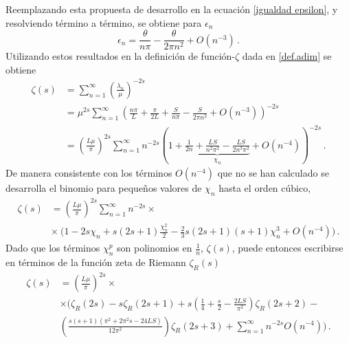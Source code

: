Reemplazando esta propuesta de desarrollo en la ecuación \eqref{igualdad epsilon}, y resolviendo término a término, se obtiene para $\epsilon _n $
\begin{equation}
    \epsilon _n = \frac{\theta}{n \pi} 
     - \frac{ \theta}{2 \pi n ^2 } + O \left( n ^{-3}\right) 
     \, .
\label{epsilons}
\end{equation}
Utilizando estos resultados en la definición de función-$\zeta$ dada en \eqref{def.adim} se obtiene
\begin{align}
\nonumber
    \zeta  (s) &=  
    \sum _{n=1} ^{\infty} 
    \left( \frac{\lambda _n }{\mu } 
    	\right) ^ {- 2s}  \\
&=
\label{eq.abajo.chi}
    \mu ^{2s} \sum _{n=1} ^{\infty} 
    \left(
	\frac{n \pi}{L } + 
    \frac{\pi}{2 L } +
    \frac{S}{n \pi } -
    \frac{S}{2 \pi n ^2   } +
    O \left(  n^{-3} \right) 
    \right) ^{-2 s}  \\[5pt]    
&= 
\nonumber
	\left( \frac{L \mu }{\pi} \right) ^{2s}    
    \sum _{n=1} ^{\infty} 
    n ^{- 2 s} 
    \left(
    1 +     
    \underbrace{
        \frac{1}{2 n} + 
        \frac{L S}{n^2 \pi ^2} -
        \frac{L S}{2 n ^3 \pi ^2} } 
        _{ \chi _n} +
        O \left(n ^{-4} \right)  
    \right ) ^{-2 s}
    \, .
\end{align}
De manera consistente con los términos  $ O (n ^{-4})$ que no se han calculado se desarrolla  el binomio para pequeños valores de $\chi _n$ hasta el orden cúbico,
\begin{align}
\label{eq.auxiliar2}
\zeta  (s) &= 
\left( \frac{L \mu }{\pi} \right) ^{2 s}
\sum _{n=1} ^{\infty}
  n  ^{-2 s} \times \\[5pt]
& \times   \ \Bigg(
	1 - 
	2 s \chi _n +  s(2s+1) \frac{\chi _n ^2}{2} - 
	\frac{2}{3} s(2s+1)(s+1) \chi _n ^3  + O \left( n ^{-4} \right) \Bigg)
	\, .
	\nonumber
\end{align}
Dado que los términos $\chi _n ^p$ son polinomios en $\frac{1}{n}$, $\zeta(s)$, puede entonces escribirse en términos de la función zeta de Riemann $\zeta _R (s)$
\begin{align}
    \zeta  (s) &= \left( \frac{L \mu }{\pi} \right) ^{2s} \times 
\\[5pt]
\nonumber
&
\times
	 \Bigg(
		\zeta _R ( 2 s ) -
		s \zeta _R ( 2s+1 ) +
		 s \left( \frac{1}{4} + \frac{s}{2} - \frac{2 L  S}{\pi ^2} \right) \zeta _R (2s +2 ) - \\[5pt]
\nonumber
		 &  \left(  
					\frac{s(s+1) ( \pi ^2 + 2 \pi ^2 s - 24 L S)}{12 \pi ^2 }
		 			\right) \zeta _R (2s+3)
		+ \sum _{n=1} ^{\infty} n ^{-2s} O ( n ^{-4})
		\Bigg)
		\, .
\end{align} 
